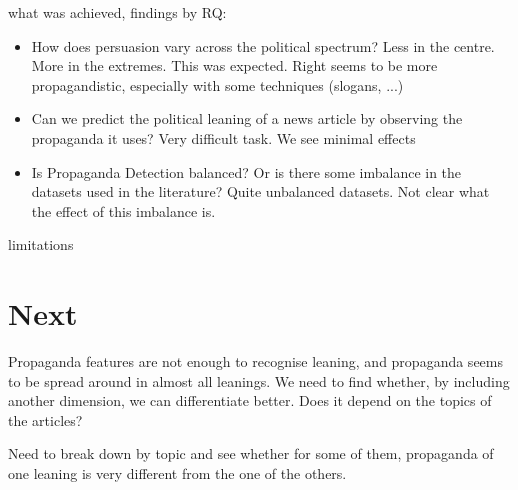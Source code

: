 what was achieved, findings by RQ:

\begin{itemize}
    \item How does persuasion vary across the political spectrum? Less in the centre. More in the extremes. This was expected. Right seems to be more propagandistic, especially with some techniques (slogans, ...)
    \item Can we predict the political leaning of a news article by observing the propaganda it uses? Very difficult task. We see minimal effects
    \item Is Propaganda Detection balanced? Or is there some imbalance in the datasets used in the literature? Quite unbalanced datasets. Not clear what the effect of this imbalance is.
\end{itemize}

limitations

\section{Next}
\label{sec:ps_next}

Propaganda features are not enough to recognise leaning, and propaganda seems to be spread around in almost all leanings. We need to find whether, by including another dimension, we can differentiate better. 
Does it depend on the topics of the articles?

Need to break down by topic and see whether for some of them, propaganda of one leaning is very different from the one of the others.